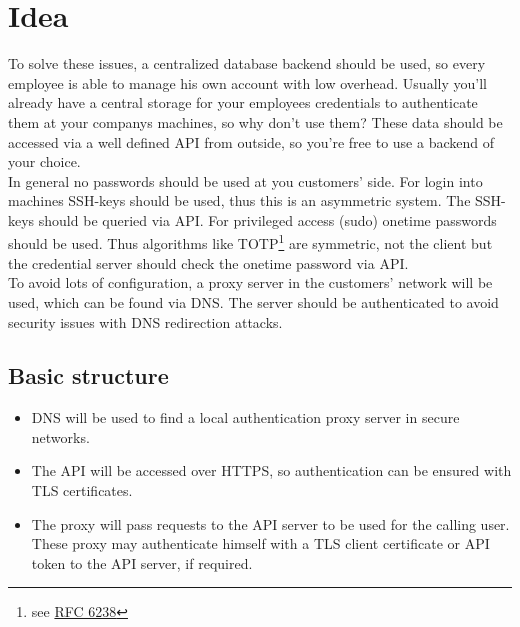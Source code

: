%
%
%
%
%
%
%


\section{Idea}

To solve these issues, a centralized database backend should be used, so every
employee is able to manage his own account with low overhead. Usually you'll
already have a central storage for your employees credentials to authenticate
them at your companys machines, so why don't use them? These data should be
accessed via a well defined API from outside, so you're free to use a backend of
your choice. \\

In general no passwords should be used at you customers' side. For login into
machines SSH-keys should be used, thus this is an asymmetric system. The
SSH-keys should be queried via API. For privileged access (sudo) onetime
passwords should be used. Thus algorithms like TOTP\footnote{see
\href{https://tools.ietf.org/html/rfc6238}{RFC 6238}} are symmetric, not the
client but the credential server should check the onetime password via API. \\

To avoid lots of configuration, a proxy server in the customers' network will be
used, which can be found via DNS. The server should be authenticated to avoid
security issues with DNS redirection attacks.


\subsection{Basic structure}

\begin{itemize}
	\item DNS will be used to find a local authentication proxy server in secure
		networks.
	\item The API will be accessed over HTTPS, so authentication can be
		ensured with TLS certificates.
	\item The proxy will pass requests to the API server to be used for the
		calling user. These proxy may authenticate himself with a TLS client
		certificate or API token to the API server, if required.
\end{itemize}

